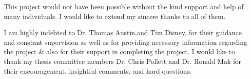 This project would not have been possible without the kind support and help of many individuals. I would like to extend my sincere thanks to all of them.

I am highly indebted to Dr. Thomas Austin,and Tim Disney,  for their guidance and constant supervision as well as for providing necessary information regarding the project \& also for their support in completing the project. I would like to thank my thesis committee members Dr. Chris Pollett and Dr. Ronald Mak for their encouragement, insightful comments, and hard questions.